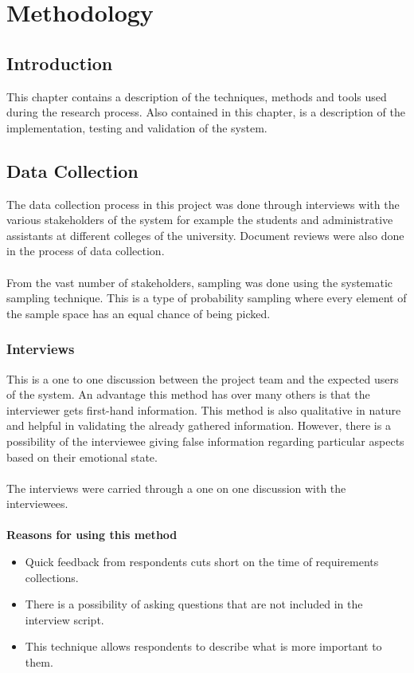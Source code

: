 \chapter{Methodology}

\section{Introduction}
This chapter contains a description of the techniques, methods and tools used during the research process. Also contained in this chapter, is a description of the implementation, testing and validation of the system. 

\section{Data Collection}
The data collection process in this project was done through interviews with the various stakeholders of the system for example the students and administrative assistants at different colleges of the university. Document reviews were also done in the process of data collection.\\~\\
From the vast number of stakeholders, sampling was done using the systematic sampling technique. This is a type of probability sampling where every element of the sample space has an equal chance of being picked. 

\subsection{Interviews}
This is a one to one discussion between the project team and the expected users of the system. An advantage this method has over many others is that the interviewer gets first-hand information. This method is also qualitative in nature and  helpful in validating the already gathered information. However, there is a possibility of the interviewee giving false information regarding particular aspects based on their emotional state. \\~\\
The interviews were carried through a one on one discussion with the interviewees.\\~\\

\textbf{Reasons for using this method}
\begin{itemize}
\item  Quick feedback from respondents cuts short on the time of requirements collections.
\item There is a possibility of asking questions that are not included in the interview script.
\item This technique allows respondents to describe what is more important to them.
\end{itemize}

